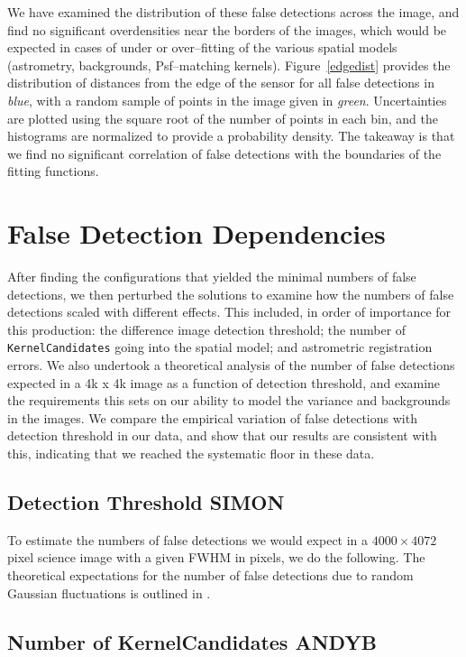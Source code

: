 \documentclass[prd, nofootinbib, floatfix, 11pt,tightenlines,times]{article}
\begin{document}
We have examined the distribution of these false detections across the
image, and find no significant overdensities near the borders of the
images, which would be expected in cases of under or over--fitting of
the various spatial models (astrometry, backgrounds, Psf--matching
kernels).  Figure~\ref{edgedist} provides the distribution of
distances from the edge of the sensor for all false detections in {\it
  blue}, with a random sample of points in the image given in {\it
  green}.  Uncertainties are plotted using the square root of the
number of points in each bin, and the histograms are normalized to
provide a probability density.  The takeaway is that we find no
significant correlation of false detections with the boundaries of the
fitting functions.

\section{False Detection Dependencies}

After finding the configurations that yielded the minimal numbers of
false detections, we then perturbed the solutions to examine how the
numbers of false detections scaled with different effects.  This
included, in order of importance for this production: the difference
image detection threshold; the number of {\tt KernelCandidates} going
into the spatial model; and astrometric registration errors.  We also
undertook a theoretical analysis of the number of false detections
expected in a 4k x 4k image as a function of detection threshold, and
examine the requirements this sets on our ability to model the
variance and backgrounds in the images.  We compare the empirical
variation of false detections with detection threshold in our data,
and show that our results are consistent with this, indicating that we
reached the systematic floor in these data.

\subsection{Detection Threshold {\bf SIMON}}

To estimate the numbers of false detections we would expect in a
$4000\times4072$ pixel science image with a given FWHM in pixels, we
do the following.  The theoretical expectations for the number of
false detections due to random Gaussian fluctuations is outlined in
\cite{Kaiser-PointSources}.

\subsection{Number of KernelCandidates {\bf ANDYB}}
\end{document}
